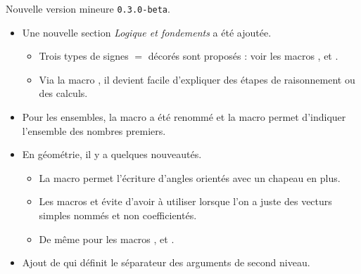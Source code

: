 Nouvelle version mineure \verb+0.3.0-beta+.

\begin{itemize}[itemsep=.5em]
    \item Une nouvelle section \emph{\og Logique et fondements \fg} a été ajoutée.
    \begin{itemize}[itemsep=.5em]
        \item Trois types de signes $=$ décorés sont proposés : voir les macros  ,  et .

        \item Via la macro , il devient facile d'expliquer des étapes de raisonnement ou des calculs.
    \end{itemize}


    \item Pour les ensembles, la macro  a été renommé  et la macro  permet d'indiquer l'ensemble des nombres premiers.


    \item En géométrie, il y a quelques nouveautés.
    \begin{itemize}[itemsep=.5em]
        \item La macro  permet l'écriture d'angles orientés avec un chapeau en plus.

        \item Les macros  et  évite d'avoir à utiliser  lorsque l'on a juste des vecturs simples nommés et non coefficientés.

        \item De même pour les macros ,  et .
    \end{itemize}


    \item Ajout de  qui définit le séparateur des arguments de second niveau.
\end{itemize}

